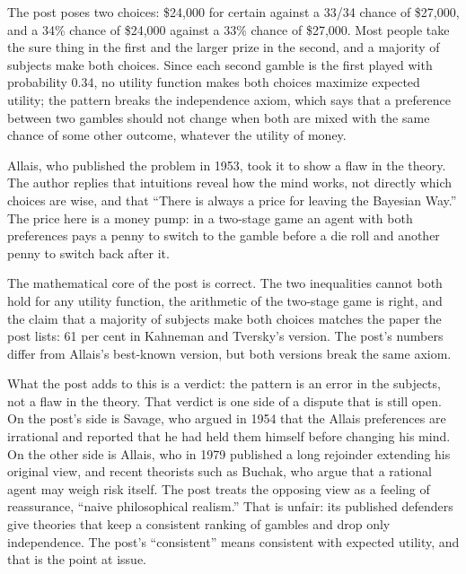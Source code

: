 \begin{afterword}
\summaryhead

The post poses two choices: \$24,000 for certain against a 33/34 chance of \$27,000, and a 34\% chance of \$24,000 against a 33\% chance of \$27,000. Most people take the sure thing in the first and the larger prize in the second, and a majority of subjects make both choices. Since each second gamble is the first played with probability 0.34, no utility function makes both choices maximize expected utility; the pattern breaks the independence axiom, which says that a preference between two gambles should not change when both are mixed with the same chance of some other outcome, whatever the utility of money.

Allais, who published the problem in 1953, took it to show a flaw in the theory. The author replies that intuitions reveal how the mind works, not directly which choices are wise, and that ``There is always a price for leaving the Bayesian Way.'' The price here is a money pump: in a two-stage game an agent with both preferences pays a penny to switch to the gamble before a die roll and another penny to switch back after it.

\responsehead

The mathematical core of the post is correct. The two inequalities cannot both hold for any utility function, the arithmetic of the two-stage game is right, and the claim that a majority of subjects make both choices matches the paper the post lists: 61 per cent in Kahneman and Tversky's version. The post's numbers differ from Allais's best-known version, but both versions break the same axiom.

What the post adds to this is a verdict: the pattern is an error in the subjects, not a flaw in the theory. That verdict is one side of a dispute that is still open. On the post's side is Savage, who argued in 1954 that the Allais preferences are irrational and reported that he had held them himself before changing his mind. On the other side is Allais, who in 1979 published a long rejoinder extending his original view, and recent theorists such as Buchak, who argue that a rational agent may weigh risk itself. The post treats the opposing view as a feeling of reassurance, ``naive philosophical realism.'' That is unfair: its published defenders give theories that keep a consistent ranking of gambles and drop only independence. The post's ``consistent'' means consistent with expected utility, and that is the point at issue.


\end{afterword}
